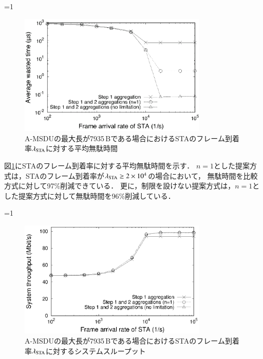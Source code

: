 \documentclass[master]{kuisthesis}		%
\newcounter{flagFig}
\begin{document}
			\par
			\ifnum\value{flagFig}=1 {\begin{figure}[htbp]
				\begin{center}
					\includegraphics[width=0.8\textwidth]{graph/wst_lmd.eps}
					\caption{A-MSDUの最大長が7935\,Bである場合におけるSTAのフレーム到着率$\lambda_{\rm STA}$に対する平均無駄時間}
					\label{fig:wst_lmd}
				\end{center}
			\end{figure}}\fi
			図\ref{fig:wst_lmd}にSTAのフレーム到着率に対する平均無駄時間を示す．
			$n=1$とした提案方式は，STAのフレーム到着率が$\lambda_{\rm STA}\geq 2 \times 10^{4}$の場合において，
			無駄時間を比較方式に対して97\%削減できている．
			更に，制限を設けない提案方式は，$n=1$とした提案方式に対して無駄時間を96\%削減している．
			\par
			\ifnum\value{flagFig}=1 {\begin{figure}[htbp]
				\begin{center}
					\includegraphics[width=0.8\textwidth]{graph/thr_lmd.eps}
					\caption{A-MSDUの最大長が7935\,Bである場合におけるSTAのフレーム到着率$\lambda_{\rm STA}$に対するシステムスループット}
					\label{fig:thr_lmd}
				\end{center}
			\end{figure}}\fi
\end{document}
